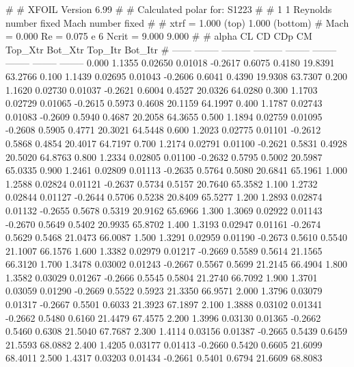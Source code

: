 #  
#       XFOIL         Version 6.99
#  
# Calculated polar for: S1223                                           
#  
# 1 1 Reynolds number fixed          Mach number fixed         
#  
# xtrf =   1.000 (top)        1.000 (bottom)  
# Mach =   0.000     Re =     0.075 e 6     Ncrit =   9.000  9.000
#  
#   alpha    CL        CD       CDp       CM     Top_Xtr  Bot_Xtr  Top_Itr  Bot_Itr
#  ------ -------- --------- --------- -------- -------- -------- -------- --------
   0.000   1.1355   0.02650   0.01018  -0.2617   0.6075   0.4180  19.8391  63.2766
   0.100   1.1439   0.02695   0.01043  -0.2606   0.6041   0.4390  19.9308  63.7307
   0.200   1.1620   0.02730   0.01037  -0.2621   0.6004   0.4527  20.0326  64.0280
   0.300   1.1703   0.02729   0.01065  -0.2615   0.5973   0.4608  20.1159  64.1997
   0.400   1.1787   0.02743   0.01083  -0.2609   0.5940   0.4687  20.2058  64.3655
   0.500   1.1894   0.02759   0.01095  -0.2608   0.5905   0.4771  20.3021  64.5448
   0.600   1.2023   0.02775   0.01101  -0.2612   0.5868   0.4854  20.4017  64.7197
   0.700   1.2174   0.02791   0.01100  -0.2621   0.5831   0.4928  20.5020  64.8763
   0.800   1.2334   0.02805   0.01100  -0.2632   0.5795   0.5002  20.5987  65.0335
   0.900   1.2461   0.02809   0.01113  -0.2635   0.5764   0.5080  20.6841  65.1961
   1.000   1.2588   0.02824   0.01121  -0.2637   0.5734   0.5157  20.7640  65.3582
   1.100   1.2732   0.02844   0.01127  -0.2644   0.5706   0.5238  20.8409  65.5277
   1.200   1.2893   0.02874   0.01132  -0.2655   0.5678   0.5319  20.9162  65.6966
   1.300   1.3069   0.02922   0.01143  -0.2670   0.5649   0.5402  20.9935  65.8702
   1.400   1.3193   0.02947   0.01161  -0.2674   0.5629   0.5468  21.0473  66.0087
   1.500   1.3291   0.02959   0.01190  -0.2673   0.5610   0.5540  21.1007  66.1576
   1.600   1.3382   0.02979   0.01217  -0.2669   0.5589   0.5614  21.1565  66.3120
   1.700   1.3478   0.03002   0.01243  -0.2667   0.5567   0.5699  21.2145  66.4904
   1.800   1.3582   0.03029   0.01267  -0.2666   0.5545   0.5804  21.2740  66.7092
   1.900   1.3701   0.03059   0.01290  -0.2669   0.5522   0.5923  21.3350  66.9571
   2.000   1.3796   0.03079   0.01317  -0.2667   0.5501   0.6033  21.3923  67.1897
   2.100   1.3888   0.03102   0.01341  -0.2662   0.5480   0.6160  21.4479  67.4575
   2.200   1.3996   0.03130   0.01365  -0.2662   0.5460   0.6308  21.5040  67.7687
   2.300   1.4114   0.03156   0.01387  -0.2665   0.5439   0.6459  21.5593  68.0882
   2.400   1.4205   0.03177   0.01413  -0.2660   0.5420   0.6605  21.6099  68.4011
   2.500   1.4317   0.03203   0.01434  -0.2661   0.5401   0.6794  21.6609  68.8083
